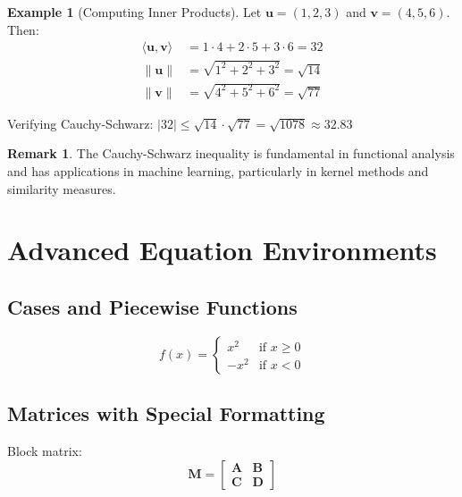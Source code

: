 \documentclass[11pt,a4paper]{article}
\theoremstyle{definition}
\newtheorem{remark}{Remark}[section]
\newtheorem{example}{Example}[section]
\begin{document}
\begin{example}[Computing Inner Products]
Let $\mathbf{u} = (1, 2, 3)$ and $\mathbf{v} = (4, 5, 6)$. Then:
\begin{align}
    \langle \mathbf{u}, \mathbf{v} \rangle &= 1 \cdot 4 + 2 \cdot 5 + 3 \cdot 6 = 32 \\
    \|\mathbf{u}\| &= \sqrt{1^2 + 2^2 + 3^2} = \sqrt{14} \\
    \|\mathbf{v}\| &= \sqrt{4^2 + 5^2 + 6^2} = \sqrt{77}
\end{align}

Verifying Cauchy-Schwarz: $|32| \leq \sqrt{14} \cdot \sqrt{77} = \sqrt{1078} \approx 32.83$ \checkmark
\end{example}

\begin{remark}
The Cauchy-Schwarz inequality is fundamental in functional analysis and has applications in machine learning, particularly in kernel methods and similarity measures.
\end{remark}

\section{Advanced Equation Environments}

\subsection{Cases and Piecewise Functions}

\begin{equation}
    f(x) = \begin{cases}
        x^2 & \text{if } x \geq 0 \\
        -x^2 & \text{if } x < 0
    \end{cases}
\end{equation}

\subsection{Matrices with Special Formatting}

Block matrix:
\begin{equation}
    \mathbf{M} = \left[\begin{array}{c|c}
        \mathbf{A} & \mathbf{B} \\
        \hline
        \mathbf{C} & \mathbf{D}
    \end{array}\right]
\end{equation}
\end{document}
